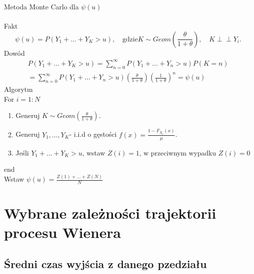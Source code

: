 \documentclass{article}
\theoremstyle{break}
\newcommand{\indep}{\perp \!\!\! \perp}
\numberwithin{equation}{subsection}
\numberwithin{figure}{section}
\begin{document}
Metoda Monte Carlo dla $\psi(u)$\\ \\
Fakt
$$\psi(u)=P(Y_1+\dots+Y_K>u),\quad \mathrm{gdzie} K\sim Geom(\frac{\theta}{1+\theta}), \quad K\indep Y_i.$$
Dowód
\begin{gather}
	P(Y_1+\dots+Y_K>u)=\sum\limits_{n=0}^{\infty}P(Y_1+\dots+Y_n>u)P(K=n)\\= \sum\limits_{n=0}^{\infty}P(Y_1+\dots+Y_n>u)(\frac{\theta}{1+\theta})(\frac{1}{1+\theta})^{n}=\psi(u)
\end{gather}
Algorytm\\
For $i=1:N$
\begin{enumerate}
	\item Generuj $K\sim Geom(\frac{\theta}{1+\theta})$.
	\item Generuj $Y_1,\dots,Y_K$- i.i.d o gęstości  $f(x)=\frac{1-F_{X_i}(x)}{\mu}$.
	\item Jeśli $Y_1+\dots+Y_K>u$, wstaw $Z(i)=1$, w przeciwnym wypadku $Z(i)=0$
\end{enumerate}
end\\
Wstaw $\psi(u)=\frac{Z(1)+\dots+Z(N)}{N}$

\section{Wybrane zależności trajektorii procesu Wienera}

\subsection{Średni czas wyjścia z danego pzedziału}
\end{document}

